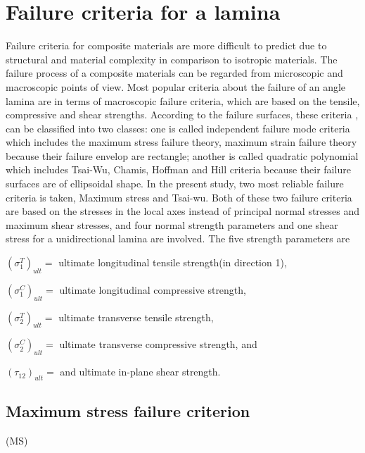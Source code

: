 \section{Failure criteria for a lamina}

Failure criteria for composite materials are more difficult to predict due to
structural and material complexity in comparison to isotropic materials. The
failure process of a composite materials can be regarded from microscopic and
macroscopic points of view. Most popular criteria about the failure of an angle
lamina are in terms of macroscopic failure criteria, which are based on the
tensile, compressive and shear strengths. According to the failure surfaces,
these criteria
\cite{massard1984computer,reddy1987first,fang1993design,soeiro1994multilevel,pelletier2006multi,jadhav2007parametric,omkar2008artificial,choudhury2019failure},
can be classified into two classes: one is called independent failure mode
criteria which includes the maximum stress failure
theory\cite{watkins1987multicriteria}, maximum strain failure theory because
their failure envelop are rectangle; another is called quadratic polynomial
which includes Tsai-Wu\cite{martin1987optimum,soares1995discrete}, Chamis,
Hoffman and Hill criteria because their failure surfaces are of ellipsoidal
shape. In the present study, two most reliable failure criteria is taken,
Maximum stress and Tsai-wu.  Both of these two failure criteria are based on
the stresses in the local axes instead of principal normal stresses and maximum
shear stresses, and four normal strength parameters and one shear stress for a
unidirectional lamina are involved. The five strength parameters are

$(\sigma _1^{T})_{ult}= $ ultimate longitudinal tensile strength(in direction 1),

$(\sigma _1^{C})_{ult}= $ ultimate longitudinal compressive strength,

$(\sigma _2^{T})_{ult}= $ ultimate transverse tensile strength,

$(\sigma _2^{C})_{ult}= $ ultimate transverse compressive strength, and

$(\tau_{12})_{ult}= $ and ultimate in-plane shear strength.



\subsection{Maximum stress failure criterion}(MS)


